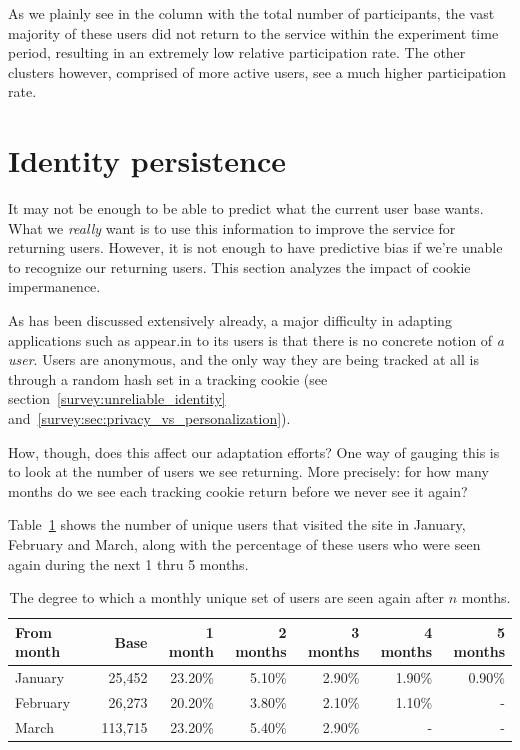 As we plainly see in the column with the total number of participants, the vast majority of these users did not return to the service within the experiment time period, resulting in an extremely low relative participation rate.
The other clusters however, comprised of more active users, see a much higher participation rate.

\section{Identity persistence}
\label{eval:sec:identity_persistence}

It may not be enough to be able to predict what the current user base wants. What we \emph{really} want is to use this information to improve the service for returning users. However, it is not enough to have predictive bias if we're unable to recognize our returning users. This section analyzes the impact of cookie impermanence.

As has been discussed extensively already, a major difficulty in adapting applications such as appear.in to its users is that there is no concrete notion of \emph{a user}. Users are anonymous, and the only way they are being tracked at all is through a random hash set in a tracking cookie (see section~\ref{survey:unreliable_identity} and~\ref{survey:sec:privacy_vs_personalization}).

How, though, does this affect our adaptation efforts? One way of gauging this is to look at the number of users we see returning. More precisely: for how many months do we see each tracking cookie return before we never see it again?

Table~\ref{tab:returning_users} shows the number of unique users that visited the site in January, February and March, along with the percentage of these users who were seen again during the next 1 thru 5 months.

\begin{table}[h]
  \begin{tabular}{|l|r|rrrrr|}
    \hline
    From month & Base    & 1 month & 2 months & 3 months & 4 months & 5 months \\ \hline
    January    & 25,452  & 23.20\% & 5.10\%   & 2.90\%   & 1.90\%   & 0.90\%   \\
    February   & 26,273  & 20.20\% & 3.80\%   & 2.10\%   & 1.10\%   & -        \\
    March      & 113,715 & 23.20\% & 5.40\%   & 2.90\%   & -        & -        \\ \hline
  \end{tabular}
  \caption{The degree to which a monthly unique set of users are seen again after $n$ months.}
  \label{tab:returning_users}
\end{table}

